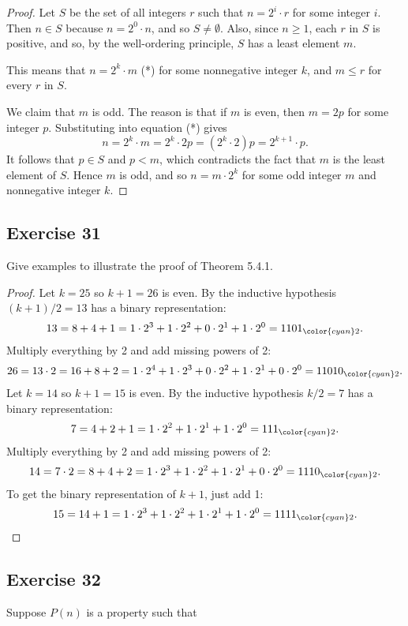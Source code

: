 \documentclass[14pt]{extarticle}
\newcommand{\base}[1]{{\color{cyan}#1}}
\begin{document}
\begin{proof}
    Let $S$ be the set of all integers $r$ such that $n = 2^i \cdot r$ for some integer $i$.
    Then $n \in S$ because $n = 2^0 \cdot n$, and so $S \neq \emptyset$.
    Also, since $n \geq 1$, each $r$ in $S$ is positive, and so, by the well-ordering principle, $S$ has a least element
    $m$.

    This means that $n = 2^k \cdot m$ (*) for some nonnegative integer $k$, and $m \leq r$ for every $r$ in $S$.

    We claim that $m$ is odd. The reason is that if $m$ is even, then $m = 2p$ for some integer $p$.
    Substituting into equation (*) gives
    \[
        n = 2^k \cdot m = 2^k \cdot 2p = (2^k \cdot 2)p = 2^{k+1} \cdot p.
    \]
    It follows that $p \in S$ and $p < m$, which contradicts the fact that $m$ is the least element of $S$.
    Hence $m$ is odd, and so $n = m \cdot 2^k$ for some odd integer $m$ and nonnegative integer $k$.
\end{proof}

\subsection{Exercise 31}
Give examples to illustrate the proof of Theorem 5.4.1.

\begin{proof}
    Let $k = 25$ so $k+1 = 26$ is even. By the inductive hypothesis $(k+1)/2 = 13$ has a binary representation:
    \[
        13 = 8 + 4 + 1 = 1 \cdot 2^3 + 1 \cdot 2^2 + 0 \cdot 2^1 + 1 \cdot 2^0 = 1101_\base{2}.
    \]
    Multiply everything by 2 and add missing powers of 2:
    \[
        26 = 13 \cdot 2 = 16 + 8 + 2 = 1 \cdot 2^4 + 1 \cdot 2^3 + 0 \cdot 2^2 + 1 \cdot 2^1 + 0 \cdot 2^0 = 11010_\base{2}.
    \]
    Let $k = 14$ so $k+1 = 15$ is even. By the inductive hypothesis $k/2 = 7$ has a binary representation:
    \[
        7 = 4 + 2 + 1 = 1 \cdot 2^2 + 1 \cdot 2^1 + 1 \cdot 2^0 = 111_\base{2}.
    \]
    Multiply everything by 2 and add missing powers of 2:
    \[
        14 = 7 \cdot 2 = 8 + 4 + 2 = 1 \cdot 2^3 + 1 \cdot 2^2 + 1 \cdot 2^1 + 0 \cdot 2^0 = 1110_\base{2}.
    \]
    To get the binary representation of $k+1$, just add 1:
    \[
        15 = 14 + 1 = 1 \cdot 2^3 + 1 \cdot 2^2 + 1 \cdot 2^1 + 1 \cdot 2^0 = 1111_\base{2}.
    \]
\end{proof}

\subsection{Exercise 32}
Suppose $P(n)$ is a property such that
\end{document}
